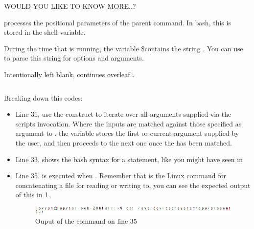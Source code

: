 \documentclass{article}
\begin{document}
\begin{shaded}
\textbf{\faSpaceShuttle} \hspace{1em} WOULD YOU LIKE TO KNOW MORE..?

 processes the positional parameters of the parent command. In bash, this is stored in the shell variable.


During the time that  is running, the variable \$\@ contains the string . You can use  to parse this string for options and arguments.
\end{shaded}

\begin{center}
\vspace{2em}
    Intentionally left blank, continues overleaf\ldots
    \vspace{2em}
\end{center}

\inputminted[frame=single,firstline=31, lastline=51,linenos]{bash}{./systemStats.sh}

Breaking down this codes:

\begin{itemize}
    \item Line 31, use the  construct to iterate over all arguments supplied via the scripts invocation. Where the inputs are matched against those specified as argument to . the  variable stores the first or current argument supplied by the user, and then proceeds to the next one once the  has been matched. 
    \item Line 33, shows the bash syntax for a  statement, like you might have seen in 
    \item Line 35. is executed when . Remember that  is the Linux command for concatenating a file for reading or writing to, you can see the expected output of this in \cref{fig:cpu_cores}.
    \begin{figure}[H]
    \centering
    \includegraphics[width=1\textwidth]{images/cpu_cores.PNG}
    \caption{Ouput of the command on line 35}
    \label{fig:cpu_cores}
    \end{figure}
    \end{itemize}
\end{document}
